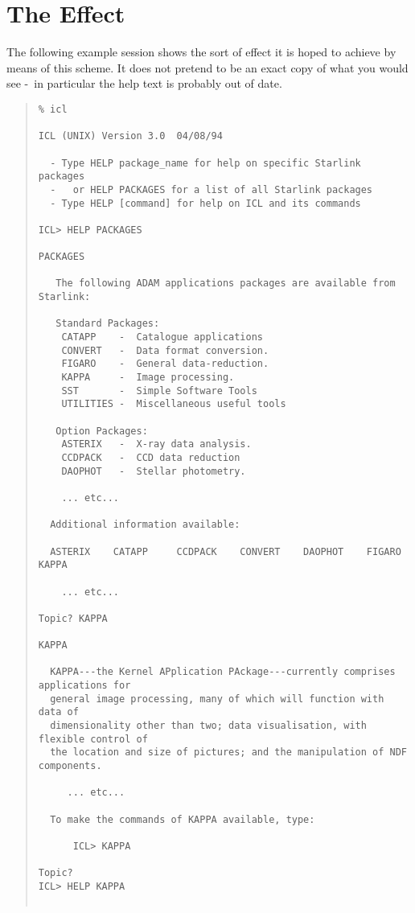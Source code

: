 \documentclass[twoside,11pt]{article}
\newcommand{\xlabel}[1]{}
\renewcommand{\_}{\texttt{\symbol{95}}}
\newcommand{\dash}{--}
\renewcommand{\dash}{-}
\begin{document}
\section{\xlabel{the_effect}The Effect}
\label{effect}
The following example session shows the sort of effect it is hoped to achieve
by means of this scheme. It does not pretend to be an exact copy of what you
would see \dash\ in particular the help text is probably out of date.
\small
\begin{quote}
\begin{verbatim}
% icl

ICL (UNIX) Version 3.0  04/08/94

  - Type HELP package_name for help on specific Starlink packages
  -   or HELP PACKAGES for a list of all Starlink packages
  - Type HELP [command] for help on ICL and its commands

ICL> HELP PACKAGES 
  
PACKAGES 
  
   The following ADAM applications packages are available from Starlink: 
  
   Standard Packages: 
    CATAPP    -  Catalogue applications
    CONVERT   -  Data format conversion. 
    FIGARO    -  General data-reduction. 
    KAPPA     -  Image processing. 
    SST       -  Simple Software Tools 
    UTILITIES -  Miscellaneous useful tools
  
   Option Packages: 
    ASTERIX   -  X-ray data analysis. 
    CCDPACK   -  CCD data reduction 
    DAOPHOT   -  Stellar photometry. 

    ... etc...  
  
  Additional information available: 
  
  ASTERIX    CATAPP     CCDPACK    CONVERT    DAOPHOT    FIGARO     KAPPA 

    ... etc...

Topic? KAPPA 
  
KAPPA  

  KAPPA---the Kernel APplication PAckage---currently comprises applications for
  general image processing, many of which will function with data of 
  dimensionality other than two; data visualisation, with flexible control of 
  the location and size of pictures; and the manipulation of NDF components. 

     ... etc...

  To make the commands of KAPPA available, type: 
  
      ICL> KAPPA 
  
Topic? 
ICL> HELP KAPPA 
  

\end{verbatim}
\end{quote}
\end{document}
